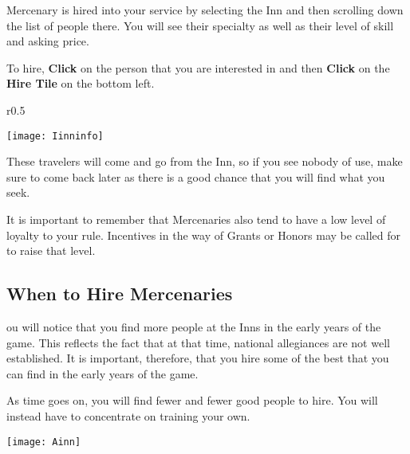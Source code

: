 Mercenary is hired into your service by selecting the Inn and then scrolling down the list of people there. You will see their specialty as well as their level of skill and asking price.

To hire, \textbf{Click} on the person that you are interested in and then \textbf{Click} on the \textbf{Hire Tile} on the bottom left.

\clearpage

\begin{wrapfigure}{r}{0.5\textwidth}
    \vspace{-20pt}
    \begin{center}
        \texttt{[image: Iinninfo]} %
    \end{center}
    \vspace{-20pt}
\end{wrapfigure}

These travelers will come and go from the Inn, so if you see nobody of use, make sure to come back later as there is a good chance that you will find what you seek.

It is important to remember that Mercenaries also tend to have a low level of loyalty to your rule. Incentives in the way of Grants or Honors may be called for to raise that level.

\subsection{\textsf{When to Hire Mercenaries}}

ou will notice that you find more people at the Inns in the early years of the game. This reflects the fact that at that time, national allegiances are not well established. It is important, therefore, that you hire some of the best that you can find in the early years of the game.

As time goes on, you will find fewer and fewer good people to hire. You will instead have to concentrate on training your own.

\begin{center}
    \texttt{[image: Ainn]} %
\end{center}